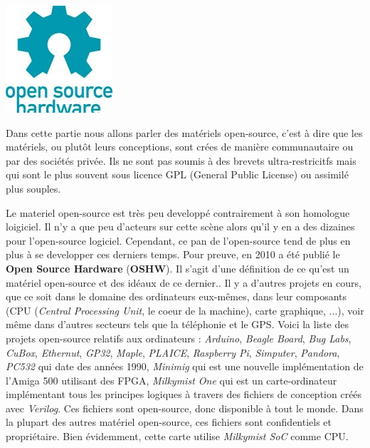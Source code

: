 \vspace{15px}
\begin{minipage}{0.40\linewidth}
\includegraphics{oshw-logo.jpg}
\end{minipage}\hfill
\begin{minipage}{0.55\linewidth}
Dans cette partie nous allons parler des matériels open-source, c'est à dire que les matériels, ou plutôt leurs conceptions, sont crées de manière communautaire ou par des sociétés privée. Ils ne sont pas soumis à des brevets ultra-restricitfs mais qui sont le plus souvent sous licence GPL (General Public License) ou assimilé plus souples. 
\end{minipage}
\medskip
Le materiel open-source est très peu developpé contrairement à son homologue loigiciel. Il n'y a que peu d'acteurs sur cette scène alors qu'il y en a des dizaines pour l'open-source logiciel. Cependant, ce pan de l'open-source tend de plus en plus à se developper ces derniers temps. Pour preuve, en 2010 a été publié le \textbf{Open Source Hardware} (\textbf{OSHW}). Il s'agit d'une définition de ce qu'est un matériel open-source et des idéaux de ce dernier..
\medskip
Il y a d'autres projets en cours, que ce soit dans le domaine des ordinateurs eux-mêmes, dans leur composants (CPU (\textit{Central Processing Unit}, le coeur de la machine), carte graphique, ...), voir même dans d'autres secteurs tels que la téléphonie et le GPS. Voici la liste des projets open-source relatifs aux ordinateurs : \textit{Arduino}, \textit{Beagle Board}, \textit{Bug Labs}, \textit{CuBox}, \textit{Ethernut}, \textit{GP32}, \textit{Maple}, \textit{PLAICE}, \textit{Raspberry Pi}, \textit{Simputer}, \textit{Pandora}, \textit{PC532} qui date des années 1990, \textit{Minimig} qui est une nouvelle implémentation de l'Amiga 500 utilisant des FPGA, \textit{Milkymist One} qui est un carte-ordinateur implémentant tous les principes logiques à travers des fichiers de conception créés avec \textit{Verilog}. Ces fichiers sont open-source, donc disponible à tout le monde. Dans la plupart des autres matériel open-source, ces fichiers sont confidentiels et propriétaire. Bien évidemment, cette carte utilise \textit{Milkymist SoC} comme CPU.
